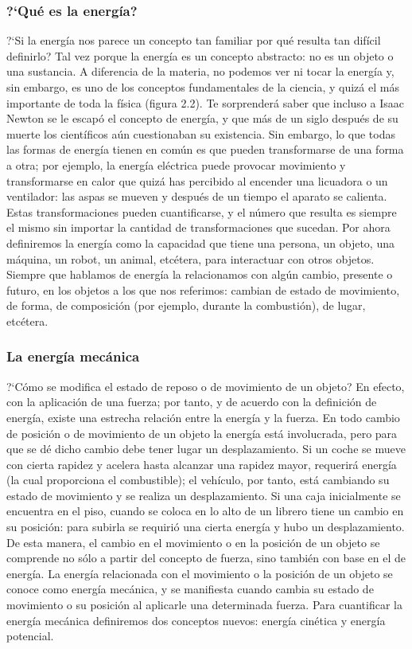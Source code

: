 \documentclass[11pt]{book}
\begin{document}
\subsubsection{?`Qu\'e es la energ\'ia?}
?`Si la energ\'ia nos parece un concepto tan familiar por qu\'e resulta tan
dif\'icil definirlo? Tal vez porque la energ\'ia es un concepto abstracto: no
es un objeto o una sustancia. A diferencia de la materia, no podemos
ver ni tocar la energ\'ia y, sin embargo, es uno de los conceptos fundamentales
de la ciencia, y quiz\'a el m\'as importante de toda la f\'isica (figura 2.2). Te
sorprender\'a saber que incluso a Isaac Newton se le escap\'o
el concepto de energ\'ia, y que m\'as de un siglo despu\'es de su muerte los
cient\'ificos a\'un cuestionaban su existencia.
Sin embargo, lo que todas las formas de energ\'ia tienen en com\'un es
que pueden transformarse de una forma a otra; por ejemplo, la energ\'ia
el\'ectrica puede provocar movimiento y transformarse en calor que quiz\'a
has percibido al encender una licuadora o un ventilador: las aspas se mueven y
despu\'es de un tiempo el aparato se calienta. Estas transformaciones
pueden cuantificarse, y el n\'umero que resulta es siempre el mismo sin importar
la cantidad de transformaciones que sucedan.
Por ahora definiremos la energ\'ia como la capacidad que tiene una
persona, un objeto, una m\'aquina, un robot, un animal, etc\'etera, para
interactuar con otros objetos. Siempre que hablamos de energ\'ia la relacionamos
con alg\'un cambio, presente o futuro, en los objetos a los que nos
referimos: cambian de estado de movimiento, de forma, de composici\'on (por
ejemplo, durante la combusti\'on), de lugar, etc\'etera.

\subsubsection{La energ\'ia mec\'anica}
?`C\'omo se modifica el estado de reposo o de movimiento de un objeto? En efecto,
con la aplicaci\'on de una fuerza; por tanto, y de acuerdo con la definici\'on
de energ\'ia, existe una estrecha relaci\'on entre la energ\'ia y la fuerza. En todo
cambio de posici\'on o de movimiento de un objeto la energ\'ia est\'a involucrada,
pero para que se d\'e dicho cambio debe tener lugar un desplazamiento.
Si un coche se mueve con cierta rapidez y acelera hasta alcanzar una
rapidez mayor, requerir\'a energ\'ia (la cual proporciona el combustible); el
veh\'iculo, por tanto, est\'a cambiando su estado de movimiento y se realiza
un desplazamiento.
Si una caja inicialmente se encuentra en el piso, cuando se coloca en lo
alto de un librero tiene un cambio en su posici\'on: para subirla se requiri\'o
una cierta energ\'ia y hubo un desplazamiento.
De esta manera, el cambio en el movimiento o en la posici\'on de un objeto
se comprende no s\'olo a partir del concepto de fuerza, sino tambi\'en con base
en el de energ\'ia. La energ\'ia relacionada con el movimiento o la posici\'on de
un objeto se conoce como energ\'ia mec\'anica, y se manifiesta cuando cambia
su estado de movimiento o su posici\'on al aplicarle una determinada fuerza.
Para cuantificar la energ\'ia mec\'anica definiremos dos conceptos nuevos:
energ\'ia cin\'etica y energ\'ia potencial.
\end{document}
